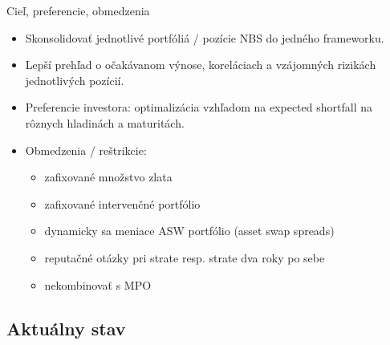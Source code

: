 \documentclass{Bredelebeamer}
\begin{document}
\begin{frame}{Cieľ, preferencie, obmedzenia}
	\begin{itemize}
		\item Skonsolidovať jednotlivé portfóliá / pozície NBS do jedného frameworku.
		\item Lepší prehľad o očakávanom výnose, koreláciach a vzájomných rizikách jednotlivých pozícií.
		\item Preferencie investora: optimalizácia vzhľadom na expected shortfall na rôznych hladinách a maturitách.
		\item Obmedzenia / reštrikcie:
		\begin{itemize}
			\item zafixované množstvo zlata
			\item zafixované intervenčné portfólio
			\item dynamicky sa meniace ASW portfólio (asset swap spreads)
			\item reputačné otázky pri strate resp. strate dva roky po sebe
			\item nekombinovať s MPO
		\end{itemize}
	\end{itemize}
\end{frame}

\subsection{Aktuálny stav}
\end{document}
